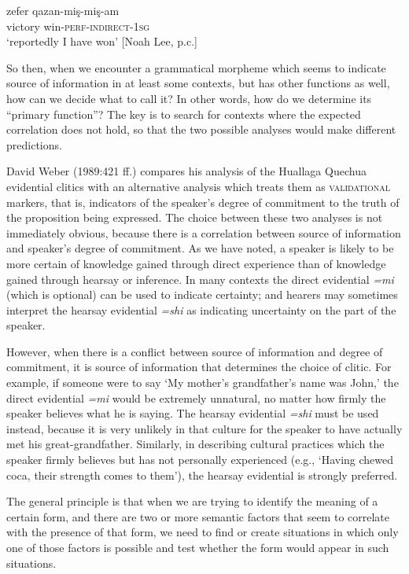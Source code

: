 \ea
\gll zefer  qazan-miş-miş-am\\
victory  win-\textsc{perf}-\textsc{indirect-1sg}\\
\glt ‘reportedly I have won’  [Noah Lee, p.c.]
\z


So then, when we encounter a grammatical morpheme which seems to indicate source of information in at least some contexts, but has other functions as well, how can we decide what to call it? In other words, how do we determine its “primary function”? The key is to search for contexts where the expected correlation does not hold, so that the two possible analyses would make different predictions.



David Weber (1989:421 ff.) compares his analysis of the Huallaga Quechua evidential clitics with an alternative analysis which treats them as \textsc{validational} markers, that is, indicators of the speaker’s degree of commitment to the truth of the proposition being expressed. The choice between these two analyses is not immediately obvious, because there is a correlation between source of information and speaker’s degree of commitment. As we have noted, a speaker is likely to be more certain of knowledge gained through direct experience than of knowledge gained through hearsay or inference. In many contexts the direct evidential \textit{=mi} (which is optional) can be used to indicate certainty; and hearers may sometimes interpret the hearsay evidential \textit{=shi} as indicating uncertainty on the part of the speaker.



However, when there is a conflict between source of information and degree of commitment, it is source of information that determines the choice of clitic. For example, if someone were to say ‘My mother’s grandfather’s name was John,’ the direct evidential \textit{=mi} would be extremely unnatural, no matter how firmly the speaker believes what he is saying. The hearsay evidential \textit{=shi} must be used instead, because it is very unlikely in that culture for the speaker to have actually met his great-grandfather. Similarly, in describing cultural practices which the speaker firmly believes but has not personally experienced (e.g., ‘Having chewed coca, their strength comes to them’), the hearsay evidential is strongly preferred.



The general principle is that when we are trying to identify the meaning of a certain form, and there are two or more semantic factors that seem to correlate with the presence of that form, we need to find or create situations in which only one of those factors is possible and test whether the form would appear in such situations.


